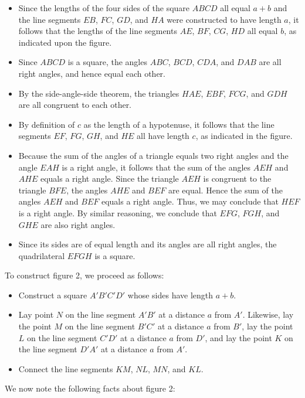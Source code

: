 \documentclass[12pt]{article}
\begin{document}
\begin{itemize}
\item  Since the lengths of the four sides of the square $ABCD$ all equal $a+b$
and the line segments $EB$, $FC$, $GD$, and $HA$ were constructed to have length
$a$, it follows that the lengths of the line segments $AE$, $BF$, $CG$, $HD$ all
equal $b$, as indicated upon the figure.
\item  Since $ABCD$ is a square, the angles $ABC$, $BCD$, $CDA$, and $DAB$ are all
right angles, and hence equal each other.
\item  By the side-angle-side theorem, the triangles $HAE$, $EBF$, $FCG$, and
$GDH$ are all congruent to each other.
\item  By definition of $c$ as the length of a hypotenuse, it follows that the
line segments $EF$, $FG$, $GH$, and $HE$ all have length $c$, as indicated in the
figure.
\item  Because the sum of the angles of a triangle equals two right angles and
the angle $EAH$ is a right angle, it follows that the sum of the angles $AEH$ and
$AHE$ equals a right angle.  Since the triangle $AEH$ is congruent to the triangle
$BFE$, the angles $AHE$ and $BEF$ are equal.  Hence the sum of the angles $AEH$
and $BEF$ equals a right angle.  Thus, we may conclude that $HEF$ is a right angle.
By similar reasoning, we conclude that $EFG$, $FGH$, and $GHE$ are also right angles.
\item  Since its sides are of equal length and its angles are all right angles, the
quadrilateral $EFGH$ is a square.
\end{itemize}
To construct figure 2, we proceed as follows:
\begin{itemize}
\item Construct a square $A'B'C'D'$ whose sides have length $a+b$.
\item Lay point $N$ on the line segment $A'B'$ at a distance $a$ from $A'$.
Likewise, lay the point $M$ on the line segment $B'C'$ at a distance $a$
from $B'$, lay the point $L$ on the line segment $C'D'$ at a distance $a$
from $D'$, and lay the point $K$ on the line segment $D'A'$ at a distance
$a$ from $A'$.
\item  Connect the line segments $KM$, $NL$, $MN$, and $KL$.
\end{itemize}
We now note the following facts about figure 2:
\end{document}
